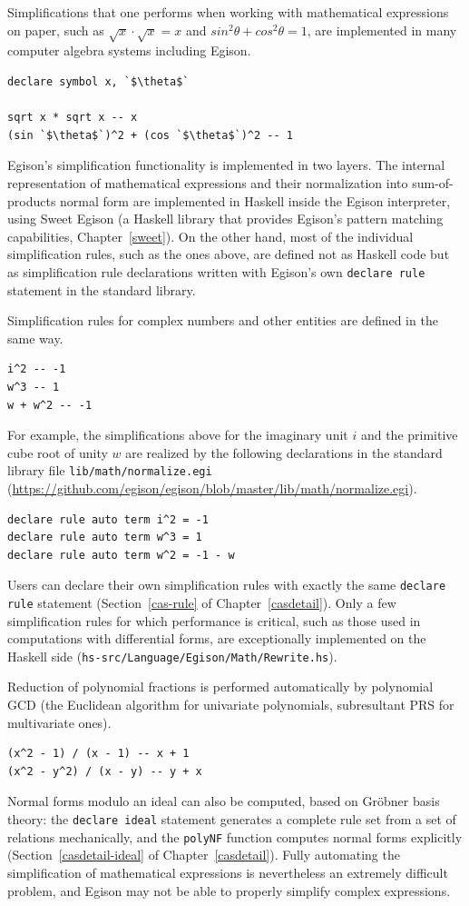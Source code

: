Simplifications that one performs when working with mathematical expressions on paper, such as $\sqrt{x} \cdot \sqrt{x} = x$ and $sin^2\theta + cos^2\theta = 1$, are implemented in many computer algebra systems including Egison.
\begin{lstlisting}[language=egison,numbers=none]
declare symbol x, `$\theta$`

sqrt x * sqrt x -- x
(sin `$\theta$`)^2 + (cos `$\theta$`)^2 -- 1
\end{lstlisting}
Egison's simplification functionality is implemented in two layers.
The internal representation of mathematical expressions and their normalization into sum-of-products normal form are implemented in Haskell inside the Egison interpreter, using Sweet Egison (a Haskell library that provides Egison's pattern matching capabilities, Chapter~\ref{sweet}).
On the other hand, most of the individual simplification rules, such as the ones above, are defined not as Haskell code but as simplification rule declarations written with Egison's own \lstinline{declare rule} statement in the standard library.

Simplification rules for complex numbers and other entities are defined in the same way.
\begin{lstlisting}[language=egison,numbers=none]
i^2 -- -1
w^3 -- 1
w + w^2 -- -1
\end{lstlisting}
For example, the simplifications above for the imaginary unit $i$ and the primitive cube root of unity $w$ are realized by the following declarations in the standard library file \texttt{lib/math/normalize.egi} (\url{https://github.com/egison/egison/blob/master/lib/math/normalize.egi}).
\begin{lstlisting}[language=egison,numbers=none]
declare rule auto term i^2 = -1
declare rule auto term w^3 = 1
declare rule auto term w^2 = -1 - w
\end{lstlisting}
Users can declare their own simplification rules with exactly the same \lstinline{declare rule} statement (Section~\ref{cas-rule} of Chapter~\ref{casdetail}).
Only a few simplification rules for which performance is critical, such as those used in computations with differential forms, are exceptionally implemented on the Haskell side (\texttt{hs-src/Language/Egison/Math/Rewrite.hs}).

Reduction of polynomial fractions is performed automatically by polynomial GCD (the Euclidean algorithm for univariate polynomials, subresultant PRS for multivariate ones).
\begin{lstlisting}[language=egison,numbers=none]
(x^2 - 1) / (x - 1) -- x + 1
(x^2 - y^2) / (x - y) -- y + x
\end{lstlisting}
Normal forms modulo an ideal can also be computed, based on Gr\"obner basis theory:
the \lstinline{declare ideal} statement generates a complete rule set from a set of relations mechanically, and the \lstinline{polyNF} function computes normal forms explicitly (Section~\ref{casdetail-ideal} of Chapter~\ref{casdetail}).
Fully automating the simplification of mathematical expressions is nevertheless an extremely difficult problem, and Egison may not be able to properly simplify complex expressions.

